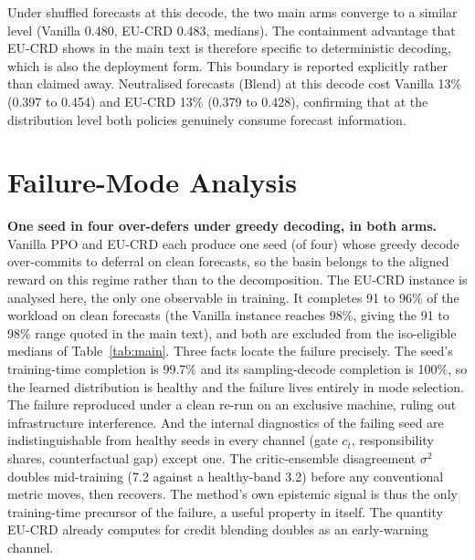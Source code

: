 \documentclass{article} %
\newif\ifRiskSampling \RiskSamplingfalse
\newif\ifFragileNone   \FragileNonefalse
\newif\ifFragilePattern \FragilePatterntrue
\newcommand{\ResFragileRange}{91 to 98\%}
\begin{document}
Under shuffled forecasts at this decode, the two main arms converge to a similar level (Vanilla 0.480, EU-CRD 0.483, medians)\ifRiskSampling, and the risk objectives sit at 0.50 to 0.51 (singles)\fi. The containment advantage that EU-CRD shows in the main text is therefore specific to deterministic decoding, which is also the deployment form. This boundary is reported explicitly rather than claimed away. Neutralised forecasts (Blend) at this decode cost Vanilla 13\% (0.397 to 0.454) and EU-CRD 13\% (0.379 to 0.428), confirming that at the distribution level both policies genuinely consume forecast information. \ifRiskSampling The risk-reshaping baselines complete the workload under sampling (their completion collapse in the main text is an interaction between their learned distributions and greedy mode selection) but occupy the worst carbon tier throughout.\fi

\section{Failure-Mode Analysis}
\label{app:failure}
\ifFragileNone\else\ifFragilePattern

\textbf{One seed in four over-defers under greedy decoding, in both arms.} Vanilla PPO and EU-CRD each produce one seed (of four) whose greedy decode over-commits to deferral on clean forecasts, so the basin belongs to the aligned reward on this regime rather than to the decomposition. The EU-CRD instance is analysed here, the only one observable in training. It completes 91 to 96\% of the workload on clean forecasts (the Vanilla instance reaches 98\%, giving the \ResFragileRange{} range quoted in the main text), and both are excluded from the iso-eligible medians of Table~\ref{tab:main}. Three facts locate the failure precisely. The seed's training-time completion is 99.7\% and its sampling-decode completion is 100\%, so the learned distribution is healthy and the failure lives entirely in mode selection. The failure reproduced under a clean re-run on an exclusive machine, ruling out infrastructure interference. And the internal diagnostics of the failing seed are indistinguishable from healthy seeds in every channel (gate $c_t$, responsibility shares, counterfactual gap) except one. The critic-ensemble disagreement $\sigma^2$ doubles mid-training (7.2 against a healthy-band 3.2) before any conventional metric moves, then recovers. The method's own epistemic signal is thus the only training-time precursor of the failure, a useful property in itself. The quantity EU-CRD already computes for credit blending doubles as an early-warning channel.
\end{document}
